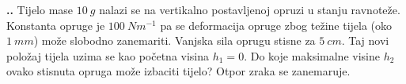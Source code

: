 
\noindent 
\textbf{
\thecjelina.\thezadatak.}
Tijelo mase $10\ g$ nalazi se na vertikalno postavljenoj opruzi u stanju ravnoteže. Konstanta
opruge je $100\ Nm^{ −1}$ pa se deformacija opruge zbog težine tijela (oko $1\ mm$) može slobodno
zanemariti. Vanjska sila oprugu stisne za $5\ cm$. Taj novi položaj tijela uzima se kao početna
visina $h_1 = 0$. Do koje maksimalne visine $h_2$ ovako stisnuta opruga može izbaciti tijelo? Otpor zraka se zanemaruje.

